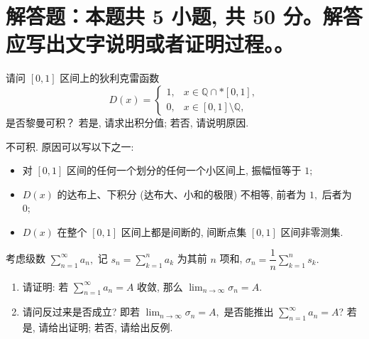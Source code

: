 \section{解答题：本题共 5 小题, 共 50 分。解答应写出文字说明或者证明过程。。}


\begin{question}[points = 8]
请问 $[0, 1]$ 区间上的狄利克雷函数
\begin{equation*}
D(x) = \begin{cases} 1, & x \in \mathbb{Q} \cap* [0, 1], \\ 0, & x \in [0, 1] \setminus \mathbb{Q}, \end{cases}
\end{equation*}
是否黎曼可积？ 若是, 请求出积分值; 若否, 请说明原因.

\end{question}

\begin{solution}
不可积. 原因可以写以下之一:
\begin{itemize}
\item[\ding{43}] 对 $[0, 1]$ 区间的任何一个划分的任何一个小区间上, 振幅恒等于 $1;$
\item[\ding{43}] $D(x)$ 的达布上、下积分 (达布大、小和的极限) 不相等, 前者为 $1,$ 后者为 $0;$
\item[\ding{43}] $D(x)$ 在整个 $[0, 1]$ 区间上都是间断的, 间断点集 $[0, 1]$ 区间非零测集.
\end{itemize}
\end{solution}

\begin{question}[points = 10]
考虑级数 $\displaystyle \sum_{n=1}^{\infty} a_n,$ 记 $\displaystyle s_n = \sum_{k=1}^{n} a_k$ 为其前 $n$ 项和, $\displaystyle \sigma_n = \dfrac{1}{n} \sum_{k=1}^{n} s_k.$
\begin{enumerate}
\item 请证明: 若 $\displaystyle \sum_{n=1}^{\infty} a_n = A$ 收敛, 那么 $\displaystyle \lim_{n\to\infty} \sigma_n = A.$
\item 请问反过来是否成立? 即若 $\displaystyle \lim_{n\to\infty} \sigma_n = A,$ 是否能推出 $\displaystyle \sum_{n=1}^{\infty} a_n = A$? 若是, 请给出证明; 若否, 请给出反例.
\end{enumerate}

\end{question}

